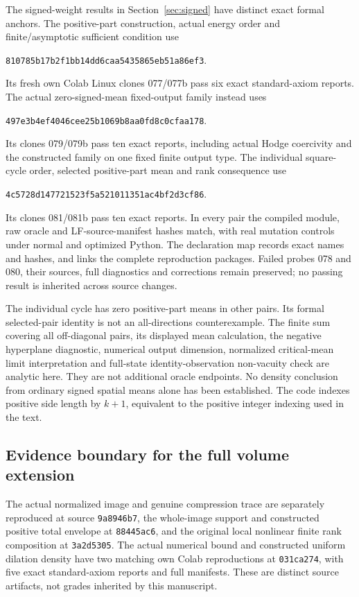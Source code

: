 \documentclass[11pt]{article}
\begin{document}
The signed-weight results in Section~\ref{sec:signed} have distinct exact
formal anchors. The positive-part construction, actual energy order and
finite/asymptotic sufficient condition use
\begin{center}\small\texttt{810785b17b2f1bb14dd6caa5435865eb51a86ef3}.\end{center}
Its fresh own Colab Linux clones 077/077b pass six exact standard-axiom
reports. The actual zero-signed-mean fixed-output family instead uses
\begin{center}\small\texttt{497e3b4ef4046cee25b1069b8aa0fd8c0cfaa178}.\end{center}
Its clones 079/079b pass ten exact reports, including actual Hodge coercivity
and the constructed family on one fixed finite output type. The individual
square-cycle order, selected positive-part mean and rank consequence use
\begin{center}\small\texttt{4c5728d147721523f5a521011351ac4bf2d3cf86}.\end{center}
Its clones 081/081b pass ten exact reports. In every pair the compiled
module, raw oracle and LF-source-manifest hashes match, with real mutation
controls under normal and optimized Python. The declaration map records
exact names and hashes, and links the complete reproduction packages.
Failed probes 078 and 080, their sources, full diagnostics and corrections
remain preserved; no passing result is inherited across source changes.

The individual cycle has zero positive-part means in other pairs. Its
formal selected-pair identity is not an all-directions counterexample.
The finite sum covering all off-diagonal pairs, its displayed mean calculation,
the negative hyperplane diagnostic, numerical output dimension, normalized
critical-mean limit interpretation and full-state identity-observation
non-vacuity check are analytic here. They are not additional oracle endpoints.
No density conclusion from ordinary signed spatial means alone has been established.
The code indexes positive side length by $k+1$, equivalent to the positive
integer indexing used in the text.

\subsection{Evidence boundary for the full volume extension}
The actual normalized image and genuine compression trace are separately
reproduced at source \texttt{9a8946b7}, the whole-image support and constructed
positive total envelope at \texttt{88445ac6}, and the original local nonlinear
finite rank composition at \texttt{3a2d5305}. The actual numerical bound and
constructed uniform dilation density have two matching own Colab reproductions
at \texttt{031ca274}, with five exact standard-axiom reports and full manifests.
These are distinct source artifacts, not grades inherited by this manuscript.
\end{document}
